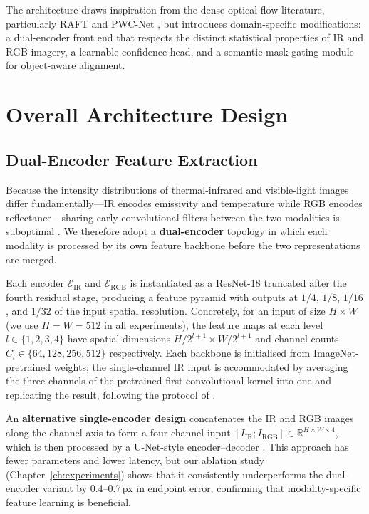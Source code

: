 The architecture draws inspiration from the dense optical-flow literature,
particularly RAFT \cite{teed2020raft} and PWC-Net \cite{sun2018pwcnet},
but introduces domain-specific modifications: a dual-encoder front end that
respects the distinct statistical properties of IR and RGB imagery, a
learnable confidence head, and a semantic-mask gating module for
object-aware alignment.

\section{Overall Architecture Design}
\label{sec:overall_arch}

\subsection{Dual-Encoder Feature Extraction}
\label{subsec:dual_encoder}

Because the intensity distributions of thermal-infrared and visible-light
images differ fundamentally---IR encodes emissivity and temperature while
RGB encodes reflectance---sharing early convolutional filters between the
two modalities is suboptimal \cite{li2018densefuse}.  We therefore adopt a
\textbf{dual-encoder} topology in which each modality is processed by its
own feature backbone before the two representations are merged.

Each encoder $\mathcal{E}_{\mathrm{IR}}$ and $\mathcal{E}_{\mathrm{RGB}}$
is instantiated as a ResNet-18 \cite{he2016deep} truncated after the
fourth residual stage, producing a feature pyramid with outputs at
$1/4$, $1/8$, $1/16$, and $1/32$ of the input spatial resolution.
Concretely, for an input of size $H \times W$ (we use $H{=}W{=}512$ in
all experiments), the feature maps at each level $l \in \{1,2,3,4\}$ have
spatial dimensions $H/2^{l+1} \times W/2^{l+1}$ and channel counts
$C_l \in \{64,128,256,512\}$ respectively.  Each backbone is initialised
from ImageNet-pretrained weights; the single-channel IR input is
accommodated by averaging the three channels of the pretrained first
convolutional kernel into one and replicating the result, following the
protocol of \cite{zhao2023cddfuse}.

An \textbf{alternative single-encoder design} concatenates the IR and RGB
images along the channel axis to form a four-channel input
$[I_{\mathrm{IR}}; I_{\mathrm{RGB}}] \in \mathbb{R}^{H \times W \times
4}$, which is then processed by a U-Net-style encoder--decoder
\cite{ronneberger2015unet}.  This approach has fewer parameters and lower
latency, but our ablation study (Chapter~\ref{ch:experiments}) shows that
it consistently underperforms the dual-encoder variant by 0.4--0.7\,px in
endpoint error, confirming that modality-specific feature learning is
beneficial.

